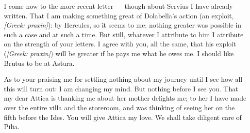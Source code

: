 I come now to the more recent letter --- though about Servius I have already written. That I am making something great of Dolabella's action (an exploit, \textit{[Greek: praxin]}): by Hercules, so it seems to me; nothing greater was possible in such a case and at such a time. But still, whatever I attribute to him I attribute on the strength of your letters. I agree with you, all the same, that his exploit (\textit{[Greek: praxin]}) will be greater if he pays me what he owes me. I should like Brutus to be at Astura.

 As to your praising me for settling nothing about my journey until I see how all this will turn out: I am changing my mind. But nothing before I see you. That my dear Attica is thanking me about her mother delights me; to her I have made over the entire villa and the storeroom, and was thinking of seeing her on the fifth before the Ides. You will give Attica my love. We shall take diligent care of Pilia.
